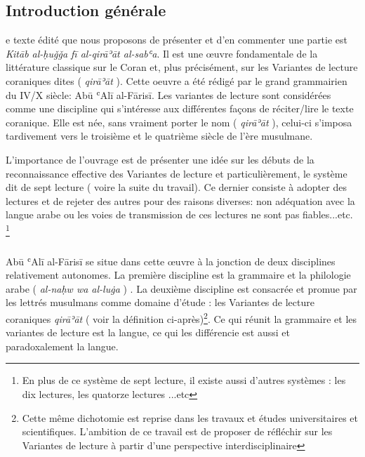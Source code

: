 \documentclass[a4paper,12pt]{report}
\begin{document}
\begin{itemize}
\chapter*{Introduction générale}
\setcounter{page}{1}


e texte  édité que nous proposons de présenter  et d’en commenter une partie est  \textit{Kitāb al-ḥuǧǧa f\=i al-qirāʾāt al-sabʿa}. Il est  une œuvre fondamentale de la littérature classique sur le Coran et, plus précisément, sur les Variantes de lecture coraniques dites ( \textit{qirāʾāt} ). Cette oeuvre a été rédigé par le grand grammairien du IV/X siècle: Abū ʿAlī al-Fārisī. Les variantes de lecture  sont considérées comme une discipline qui s’intéresse aux différentes façons de réciter/lire le texte coranique. Elle est née, sans vraiment porter le nom ( \textit{qirāʾāt} ), celui-ci s’imposa  tardivement vers le troisième et le quatrième siècle de l’ère musulmane.  

L'importance de l'ouvrage  est de présenter une idée sur les débuts de la reconnaissance  effective des Variantes de lecture et particulièrement, le système dit de sept lecture ( voire la suite du  travail). Ce dernier  consiste  à adopter des lectures  et de rejeter des autres pour des raisons diverses: non adéquation avec la langue arabe ou les voies de transmission de ces lectures ne sont pas fiables...etc. \footnote{ En plus de ce système de sept lecture, il existe aussi d'autres systèmes : les dix lectures, les quatorze lectures ...etc}
\paragraph{}

 Abū ʿAlī al-Fāris\=i se situe  dans cette œuvre à  la jonction de deux disciplines relativement autonomes. La première discipline   est la grammaire et la philologie arabe ( \textit{al-naḥw wa al-luġa} ) . La deuxième discipline est  consacrée et promue par les lettrés musulmans comme domaine d’étude : les Variantes de lecture coraniques \textit{qirāʾāt} ( voir  la définition ci-après)\footnote { Cette même dichotomie est  reprise dans les travaux et études universitaires et scientifiques. L'ambition de ce travail est de proposer de réfléchir sur les Variantes de lecture à partir d'une perspective interdisciplinaire }. Ce qui réunit la grammaire et les variantes de lecture est la langue, ce qui les différencie est aussi et paradoxalement la langue. 
 

\end{itemize}
\end{document}
